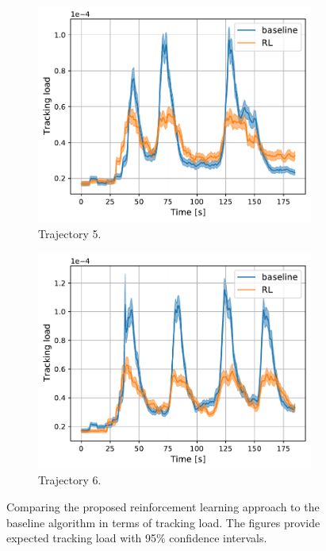 \documentclass[english, 12pt, a4paper, elec, utf8, a-1b, online]{aaltothesis}
\begin{document}
\begin{figure}
\begin{subfigure}[b]{0.45\textwidth}
        \label{fig:TL_T4}
    \end{subfigure}
    \hfill
    \begin{subfigure}[b]{0.45\textwidth}
        \centering
        \includegraphics[width=\linewidth]{figures/benchmark/Simulations/tracking_load_4.pdf}
        \caption{Trajectory 5.}
        \label{fig:TL_T5}
    \end{subfigure}
    \hfill
    \begin{subfigure}[b]{0.45\textwidth}
        \centering
        \includegraphics[width=\linewidth]{figures/benchmark/Simulations/tracking_load_5.pdf}
        \caption{Trajectory 6.}
        \label{fig:TL_T6}
    \end{subfigure}
    \caption{Comparing the proposed reinforcement learning approach to the baseline algorithm in terms of tracking load.
    The figures provide expected tracking load with 95\% confidence intervals.}
    \label{fig:tracking_load_comparison}
\end{figure}
\end{document}
